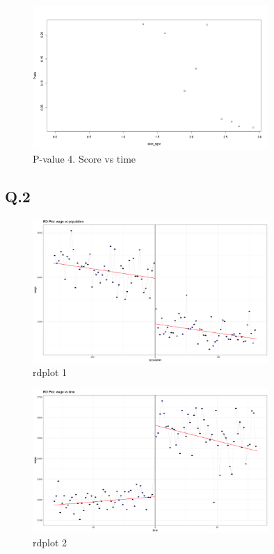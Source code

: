 \documentclass{article}
\begin{document}
\begin{figure}[H]
    \centering
    \includegraphics[width=0.8\textwidth]{figures/q1_pvalue4.png}
    \caption{P-value 4. Score vs time}
    \label{fig:q1_pvalue_4}
\end{figure}


\subsection*{Q.2}

\begin{figure}[H]
    \centering
    \includegraphics[width=0.8\textwidth]{figures/rd_cont_1.png}
    \caption{rdplot 1}
    \label{fig:rdcont1}
\end{figure}


\begin{figure}[H]
    \centering
    \includegraphics[width=0.8\textwidth]{figures/rd_cont_2.png}
    \caption{rdplot 2}
    \label{fig:rdcont2}
\end{figure}
\end{document}
